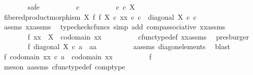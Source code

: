\begin{isabellebody}
\ \ \ \ \ \ \isamarkupfalse%
\ safe\isanewline
\ \ \ \ \ \ \ \ \isamarkupfalse%
\ c\isanewline
\ \ \ \ \ \ \ \ \isamarkupfalse%
\ {\isachardoublequoteopen}c\ {\isasymin}\isactrlsub c\ X{\isachardoublequoteclose}\isanewline
\ \ \ \ \ \ \ \ \isamarkupfalse%
\ \isamarkupfalse%
\ {\isachardoublequoteopen}fibered{\isacharunderscore}{\kern0pt}product{\isacharunderscore}{\kern0pt}morphism\ X\ f\ f\ X\ {\isasymcirc}\isactrlsub c\ xx\ {\isasymcirc}\isactrlsub c\ c\ {\isacharequal}{\kern0pt}\ diagonal\ X\ {\isasymcirc}\isactrlsub c\ c{\isachardoublequoteclose}\isanewline
\ \ \ \ \ \ \ \ \ \ \isamarkupfalse%
\ assms\ xx{\isacharunderscore}{\kern0pt}assms\ \isamarkupfalse%
\ {\isacharparenleft}{\kern0pt}typecheck{\isacharunderscore}{\kern0pt}cfuncs{\isacharcomma}{\kern0pt}\ simp\ add{\isacharcolon}{\kern0pt}\ comp{\isacharunderscore}{\kern0pt}associative{}\ xx{\isacharunderscore}{\kern0pt}assms{\isacharparenleft}{\kern0pt}{}{\isacharparenright}{\kern0pt}{\isacharparenright}{\kern0pt}\isanewline
\ \ \ \ \ \ \isamarkupfalse%
\isanewline
\ \ \ \ \ \ \isamarkupfalse%
\ f{}{\isacharcolon}{\kern0pt}\ {\isachardoublequoteopen}xx\ {\isacharcolon}{\kern0pt}\ X\ {\isasymrightarrow}\ codomain\ xx{\isachardoublequoteclose}\isanewline
\ \ \ \ \ \ \ \ \isamarkupfalse%
\ cfunc{\isacharunderscore}{\kern0pt}type{\isacharunderscore}{\kern0pt}def\ xx{\isacharunderscore}{\kern0pt}assms\ \isamarkupfalse%
\ presburger\isanewline
\ \ \ \ \ \ \isamarkupfalse%
\ f{}{\isacharcolon}{\kern0pt}\ {\isachardoublequoteopen}diagonal\ X\ {\isasymcirc}\isactrlsub c\ a\ {\isacharequal}{\kern0pt}\ {\isasymlangle}a{\isacharcomma}{\kern0pt}a{\isasymrangle}{\isachardoublequoteclose}\isanewline
\ \ \ \ \ \ \ \ \isamarkupfalse%
\ a{\isacharunderscore}{\kern0pt}assms\ diag{\isacharunderscore}{\kern0pt}on{\isacharunderscore}{\kern0pt}elements\ \isamarkupfalse%
\ blast\isanewline
\ \ \ \ \ \ \isamarkupfalse%
\ f{}{\isacharcolon}{\kern0pt}\ {\isachardoublequoteopen}codomain\ {\isacharparenleft}{\kern0pt}xx\ {\isasymcirc}\isactrlsub c\ a{\isacharparenright}{\kern0pt}\ {\isacharequal}{\kern0pt}\ codomain\ xx{\isachardoublequoteclose}\isanewline
\ \ \ \ \ \ \ \ \isamarkupfalse%
\ f{}\ \isamarkupfalse%
\ {\isacharparenleft}{\kern0pt}meson\ a{\isacharunderscore}{\kern0pt}assms\ cfunc{\isacharunderscore}{\kern0pt}type{\isacharunderscore}{\kern0pt}def\ comp{\isacharunderscore}{\kern0pt}type{\isacharparenright}{\kern0pt}\isanewline

\end{isabellebody}
